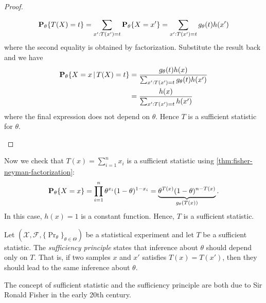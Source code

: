 \documentclass[a4paper]{article}
\begin{document}
\begin{proof}
\begin{itemize}
			\begin{align*}
				\pr[\theta]{T(X)=t}
				= \sum_{x' : T(x')=t} \pr[\theta]{X=x'}
				= \sum_{x' : T(x')=t} g_{\theta}(t) h(x')
			\end{align*}
			where the second equality is obtained by factorization.
			Substitute the result back and we have
			\begin{align*}
				\pr[\theta]{X=x\given T(X)=t}
				&= \frac{ g_{\theta}(t) h(x) }{\sum_{x' : T(x')=t} g_{\theta}(t) h(x')} \\
				&= \frac{  h(x) }{\sum_{x' : T(x')=t} h(x')}
			\end{align*}
			where the final expression does not depend on $\theta$.
			Hence $T$ is a sufficient statistic for $\theta$.
			\qedhere
	\end{itemize}
\end{proof}

\begin{example}
	Now we check that $T(x)=\sum_{i=1}^{n}x_i$ is a sufficient statistic using \autoref{thm:fisher-neyman-factorization}:
	\begin{align*}
		\pr[\theta]{X=x}
		= \prod_{i=1}^{n} \theta^{x_i} (1-\theta)^{1-x_i}
		= \underbrace{\theta^{T(x)} (1-\theta)^{n-T(x)}}_{g_{\theta}(T(x))}.
	\end{align*}
	In this case, $h(x)=1$ is a constant function.
	Hence, $T$ is a sufficient statistic.
\end{example}

\begin{definition}
	Let $(\mathcal{X},\mathcal{F},\{\Pr_{\theta}\}_{\theta\in\Theta})$ be a statistical experiment and
	let $T$ be a sufficient statistic.
	The \emph{sufficiency principle} states that inference about $\theta$ should depend only on $T$.
	That is, if two samples $x$ and $x'$ satisfies $T(x)=T(x')$,
	then they should lead to the same inference about $\theta$.
\end{definition}

\begin{remark}
	The concept of sufficient statistic and the sufficiency principle
	are both due to Sir Ronald Fisher in the early 20th century.
\end{remark}

\printbibliography
\end{document}
